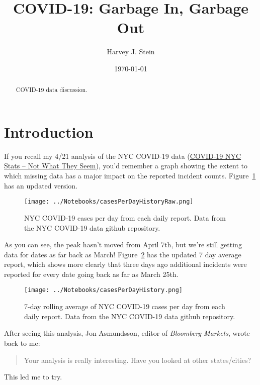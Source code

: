 \documentclass[10pt,reqno]{amsart}
\author{Harvey J. Stein}
\date{\today}
\begin{document}
\title{COVID-19: Garbage In, Garbage Out}

\begin{abstract}
  COVID-19 data discussion.
\end{abstract}

\maketitle
\tableofcontents

\section{Introduction}
\label{sec:intro}
If you recall my 4/21 analysis of the NYC COVID-19 data
(\href{https://hjstein.blogspot.com/2020/04/covid-19-nyc-stats-not-what-they-seem.html}{COVID-19 NYC Stats -- Not What They Seem}),
you'd remember a graph showing the extent to which missing
data has a major impact on the reported incident counts.
Figure~\ref{fig:daily} has an updated version.

\begin{figure}[H]
  \centering
  \texttt{[image: ../Notebooks/casesPerDayHistoryRaw.png]}
  \caption{NYC COVID-19 cases per day from each daily report.  Data
    from the NYC COVID-19 data github repository.}
  \label{fig:daily}
\end{figure}

As you can see, the peak hasn't moved from April 7th, but we're still
getting data for dates as far back as March!
Figure~\ref{fig:smoothDaily} has the updated 7 day average report,
which shows more clearly that three days ago additional incidents were
reported for every date going back as far as March 25th.

\begin{figure}[H]
  \centering
  \texttt{[image: ../Notebooks/casesPerDayHistory.png]}
  \caption{7-day rolling average of NYC COVID-19 cases per day from each daily report.  Data
    from the NYC COVID-19 data github repository.}
  \label{fig:smoothDaily}
\end{figure}

After seeing this analysis, Jon Asmundsson, editor of {\it Bloomberg
  Markets}, wrote back to me:
\begin{quotation}
  Your analysis is really interesting.  Have you looked at other states/cities?
\end{quotation}

This led me to try.
\end{document}
